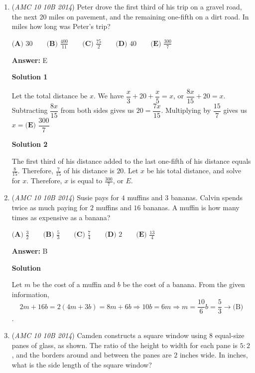 \begin{enumerate}
 


	\item (\textit{AMC 10 10B 2014}) Peter drove the first third of his trip on a gravel road, the next $20$ miles on pavement, and the remaining one-fifth on a dirt road. In miles how long was Peter's trip?


 $\textbf {(A) } 30 \qquad \textbf {(B) } \frac{400}{11} \qquad \textbf {(C) } \frac{75}{2} \qquad \textbf {(D) } 40 \qquad \textbf {(E) } \frac{300}{7}$

 \textbf{Answer: }E



\textbf{Solution 1}

Let the total distance be $x$. We have $\dfrac{x}{3} + 20 + \dfrac{x}{5} = x$, or $\dfrac{8x}{15} + 20 = x$. Subtracting $\dfrac{8x}{15}$ from both sides gives us $20 = \dfrac{7x}{15}$. Multiplying by $\dfrac{15}{7}$ gives us $x = \boxed{{\textbf{(E) }\dfrac{300}{7}}}$




\textbf{Solution 2}

The first third of his distance added to the last one-fifth of his distance equals $\frac{8}{15}$. Therefore, $\frac{7}{15}$ of his distance is $20$. Let $x$ be his total distance, and solve for $x$. Therefore, $x$ is equal to $\frac{300}{7}$, or $E$.

 


 


	\item (\textit{AMC 10 10B 2014}) Susie pays for $4$ muffins and $3$ bananas. Calvin spends twice as much paying for $2$ muffins and $16$ bananas. A muffin is how many times as expensive as a banana?


 $\textbf {(A) } \frac{3}{2} \qquad \textbf {(B) } \frac{5}{3} \qquad \textbf {(C) } \frac{7}{4} \qquad \textbf {(D) } 2 \qquad \textbf {(E) } \frac{13}{4}$

 \textbf{Answer: }B



\textbf{Solution}

Let $m$ be the cost of a muffin and $b$ be the cost of a banana. From the given information, 
 \[2m+16b=2(4m+3b)=8m+6b\Rightarrow 10b=6m\Rightarrow m=\frac{10}{6}b=\boxed{\frac{5}{3}\rightarrow \text{(B)}}\].

 


 


 


	\item (\textit{AMC 10 10B 2014}) Camden constructs a square window using $8$ equal-size panes of glass, as shown. The ratio of the height to width for each pane is $5 : 2$, and the borders around and between the panes are $2$ inches wide. In inches, what is the side length of the square window?


\end{enumerate}
